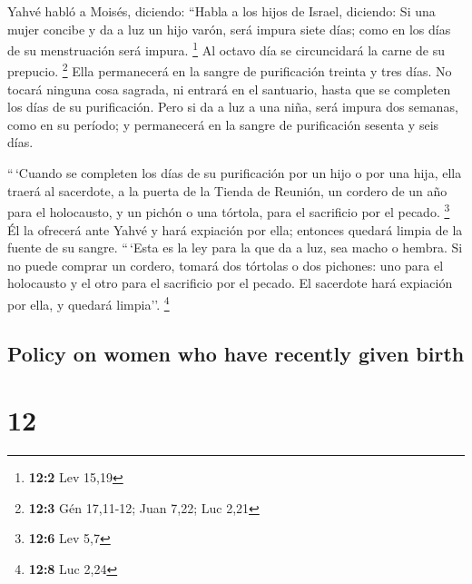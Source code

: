 \begin{paracol}{2}
 Yahvé habló a Moisés, diciendo:  ``Habla a
los hijos de Israel, diciendo: Si una mujer concibe y da a luz un hijo
varón, será impura siete días; como en los días de su menstruación será
impura. \footnote{\textbf{12:2} Lev 15,19}  Al octavo día
se circuncidará la carne de su prepucio. \footnote{\textbf{12:3} Gén
  17,11-12; Juan 7,22; Luc 2,21}  Ella permanecerá en la
sangre de purificación treinta y tres días. No tocará ninguna cosa
sagrada, ni entrará en el santuario, hasta que se completen los días de
su purificación.  Pero si da a luz a una niña, será impura
dos semanas, como en su período; y permanecerá en la sangre de
purificación sesenta y seis días.

 ``\,`Cuando se completen los días de su purificación por
un hijo o por una hija, ella traerá al sacerdote, a la puerta de la
Tienda de Reunión, un cordero de un año para el holocausto, y un pichón
o una tórtola, para el sacrificio por el pecado. \footnote{\textbf{12:6}
  Lev 5,7}  Él la ofrecerá ante Yahvé y hará expiación por
ella; entonces quedará limpia de la fuente de su sangre. ``\,`Esta es la
ley para la que da a luz, sea macho o hembra.  Si no puede
comprar un cordero, tomará dos tórtolas o dos pichones: uno para el
holocausto y el otro para el sacrificio por el pecado. El sacerdote hará
expiación por ella, y quedará limpia''. \footnote{\textbf{12:8} Luc 2,24}

\switchcolumn
\begin{otherlanguage}{english}

\hypertarget{policy-on-women-who-have-recently-given-birth}{%
\subsection{Policy on women who have recently given
birth}\label{policy-on-women-who-have-recently-given-birth}}

\hypertarget{section-23}{%
\section{12}\label{section-23}}


\end{otherlanguage}
\end{paracol}
